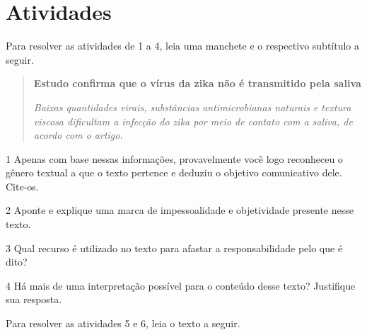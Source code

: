 \section{Atividades}

Para resolver as atividades de 1 a 4, leia uma manchete e o respectivo
subtítulo a seguir.


\begin{quote}
\textbf{Estudo confirma que o vírus da zika não é transmitido pela
saliva} 

\emph{Baixas quantidades virais, substâncias antimicrobianas
naturais e textura viscosa dificultam a infecção do zika por meio de
contato com a saliva, de acordo com o artigo.}
\end{quote}


\num{1} Apenas com base nessas informações, provavelmente você logo
reconheceu o gênero textual a que o texto pertence e deduziu o objetivo
comunicativo dele. Cite-os.


\num{2} Aponte e explique uma marca de impessoalidade e objetividade
presente nesse texto.


\num{3} Qual recurso é utilizado no texto para afastar a
responsabilidade pelo que é dito?


\num{4} Há mais de uma interpretação possível para o conteúdo desse
texto? Justifique sua resposta.


Para resolver as atividades 5 e 6, leia o texto a seguir.

